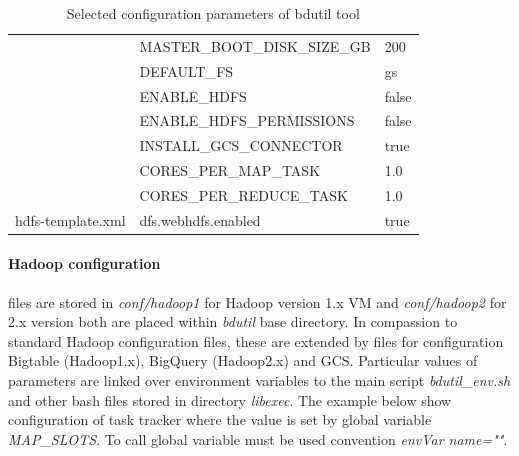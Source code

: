 \documentclass[a4paper,12pt,oneside]{report}
\begin{document}
\begin{table}[!htbp]
\begin{scriptsize}
\begin{tabular}{@{}lll@{}}
				\multicolumn{1}{|l|}{}                                 &
				\multicolumn{1}{l|}{MASTER\_BOOT\_DISK\_SIZE\_GB} & \multicolumn{1}{l|}{200}    
				\\ \cmidrule(l){2-3} 
				\multicolumn{1}{|l|}{}                                 &
				\multicolumn{1}{l|}{DEFAULT\_FS}                  & \multicolumn{1}{l|}{gs}     
				\\ \cmidrule(l){2-3} 
				\multicolumn{1}{|l|}{}                                 &
				\multicolumn{1}{l|}{ENABLE\_HDFS}                 & \multicolumn{1}{l|}{false}  
				\\ \cmidrule(l){2-3} 
				\multicolumn{1}{|l|}{}                                 &
				\multicolumn{1}{l|}{ENABLE\_HDFS\_PERMISSIONS}    & \multicolumn{1}{l|}{false}  
				\\ \cmidrule(l){2-3} 
				\multicolumn{1}{|l|}{}                                 &
				\multicolumn{1}{l|}{INSTALL\_GCS\_CONNECTOR}      & \multicolumn{1}{l|}{true}   
				\\ \cmidrule(l){2-3} 
				\multicolumn{1}{|l|}{}                                 &
				\multicolumn{1}{l|}{CORES\_PER\_MAP\_TASK}        & \multicolumn{1}{l|}{1.0}    
				\\ \cmidrule(l){2-3} 
				\multicolumn{1}{|l|}{}                                 &
				\multicolumn{1}{l|}{CORES\_PER\_REDUCE\_TASK}     & \multicolumn{1}{l|}{1.0}    
				\\ \midrule
				\multicolumn{1}{|l|}{hdfs-template.xml}                &
				\multicolumn{1}{l|}{dfs.webhdfs.enabled}          & \multicolumn{1}{l|}{true}   
				\\ \midrule
				
			\end{tabular}
			\caption{Selected configuration parameters of bdutil tool}
			\label{bdutil:config.sh}
		\end{scriptsize}
	\end{table}
	\paragraph{Hadoop configuration} files  are stored in \textit{conf/hadoop1} for
	Hadoop version 1.x VM and 
	\textit{conf/hadoop2} for 2.x version both are placed within \textit{bdutil}
	base directory. In compassion to standard Hadoop configuration files, 
	these are extended by files for configuration Bigtable (Hadoop1.x), 
	BigQuery (Hadoop2.x) and GCS. Particular values of parameters are linked over
	environment variables to   the main script \textit{bdutil\_env.sh} and other
	bash files stored in directory \textit{libexec}.  The 
	example below show configuration of task tracker where the value is set by global variable 
	\textit{MAP\_SLOTS}. To call global variable must be used convention \textit{envVar name=""}.
	
\end{document}
